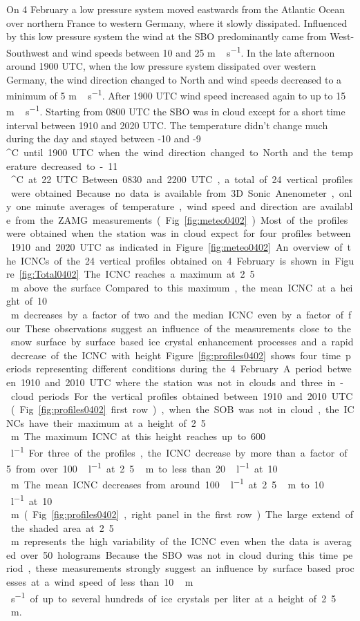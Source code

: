 \documentclass[draft,linenumbers]{agujournal}
\begin{document}
{On 4 February a low pressure system moved eastwards from the Atlantic Ocean over northern France to western Germany, where it slowly dissipated. Influenced by this low pressure system the wind at the SBO predominantly came from West-Southwest and wind speeds between 10 and 25 \si{m\,s^{-1}}. In the late afternoon around 1900 UTC, when the low pressure system dissipated over western Germany, the wind direction changed to North and wind speeds decreased to a minimum of 5 \si{m\,s^{-1}}. After 1900 UTC wind speed increased again to up to 15 \si{m\,s^{-1}}. Starting from 0800 UTC the SBO was in cloud except for a short time interval between 1910 and 2020 UTC. The temperature didn't change much during the day and stayed between -10 and -9\,\si{^\circ C} until 1900 UTC when the wind direction changed to North and the temperature decreased to -11\,\si{^\circ C} at 22 UTC.
Between 0830 and 2200 UTC, a total of 24 vertical profiles were obtained. Because no data is available from 3D Sonic Anenometer, only one minute averages of temperature, wind speed and direction are available from the ZAMG measurements (Fig. \ref{fig:meteo0402}). Most of the profiles were obtained when the station was in cloud expect for four profiles between 1910 and 2020 UTC as indicated in Figure \ref{fig:meteo0402}. %

An overview of the ICNCs of the 24 vertical profiles obtained on 4 February is shown in Figure \ref{fig:Total0402}. The ICNC reaches a maximum at 2.5\,\si{m} above the surface. Compared to this maximum, the mean ICNC at a height of 10\,\si{m}decreases by a factor of two and the median ICNC even by a factor of four. These observations suggest an influence of the measurements close to the snow surface by surface based ice crystal enhancement processes and a rapid decrease of the ICNC with height.

Figure \ref{fig:profiles0402} shows four time periods representing different conditions during the 4 February. A period between 1910 and 2010 UTC where the station was not in clouds and three in-cloud periods. 

For the vertical profiles obtained between 1910 and 2010 UTC (Fig. \ref{fig:profiles0402} first row), when the SOB was not in cloud, the ICNCs have their maximum at a height of 2.5\,\si{m}. The maximum ICNC at this height reaches up to 600\,\si{l^{-1}}. For three of the profiles, the ICNC decrease by more than a factor of 5 from over 100\,\si{l^{-1}} at 2.5\,\si{m} to less than 20\,\si{l^{-1}} at 10\,\si{m}. The mean ICNC decreases from around 100\,\si{l^{-1}} at 2.5\,\si{m} to 10\,\si{l^{-1}} at 10\,\si{m} (Fig. \ref{fig:profiles0402}, right panel in the first row). The large extend of the shaded area at 2.5\,\si{m} represents the high variability of the ICNC even when the data is averaged over 50 holograms. Because the SBO was not in cloud during this time period, these measurements strongly suggest an influence by surface based processes at a wind speed of less than 10\,\si{m\,s^{-1}} of up to several hundreds of ice crystals per liter at a height of 2.5\,\si{m}.

}
\end{document}
